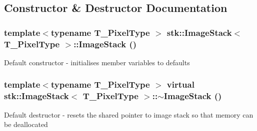 \subsection{Constructor \& Destructor Documentation}
\hypertarget{classstk_1_1ImageStack_a423e47e3f85dced370a6a688dd357f22}{
\subsubsection[{ImageStack}]{\setlength{\rightskip}{0pt plus 5cm}template$<$typename T\_\-PixelType $>$ {\bf stk::ImageStack}$<$ T\_\-PixelType $>$::{\bf ImageStack} ()}}
\label{classstk_1_1ImageStack_a423e47e3f85dced370a6a688dd357f22}
Default constructor -\/ initialises member variables to defaults \hypertarget{classstk_1_1ImageStack_a9dbdbbd1b1ca0322c07bcfcf906933e5}{
\subsubsection[{$\sim$ImageStack}]{\setlength{\rightskip}{0pt plus 5cm}template$<$typename T\_\-PixelType $>$ virtual {\bf stk::ImageStack}$<$ T\_\-PixelType $>$::$\sim${\bf ImageStack} ()}}
\label{classstk_1_1ImageStack_a9dbdbbd1b1ca0322c07bcfcf906933e5}
Default destructor -\/ resets the shared pointer to image stack so that memory can be deallocated 

